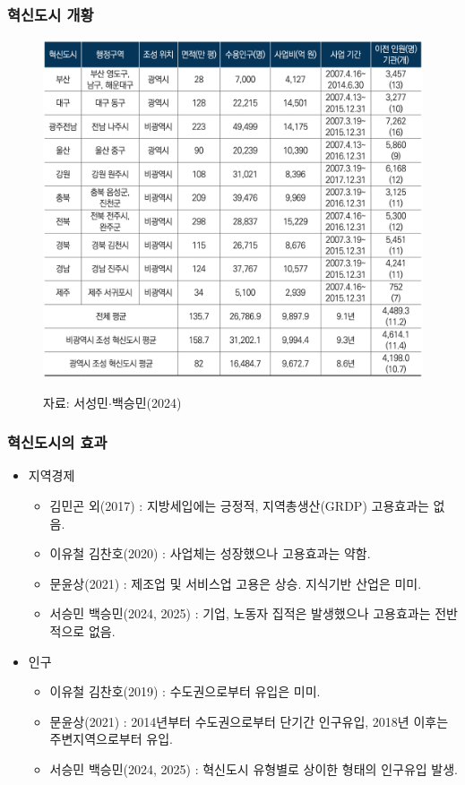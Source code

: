 \documentclass[aspectratio=169,xcolor=dvipsnames,handout]{beamer}
\begin{document}
\begin{frame}
    \frametitle{혁신도시 개황}
    \centering
    \begin{figure}
        \includegraphics[width=.5\textwidth]{pic/혁신도시.png}
        \\
        \raggedright
        \hspace{1em}
        \tiny{자료: 서성민$\cdot$백승민(2024)}
    \end{figure}
\end{frame}

\begin{frame}[allowframebreaks]
    \frametitle{혁신도시의 효과}
    \begin{itemize}[<+->]
        \item 지역경제
        \begin{itemize}[<+->]
            \item 김민곤 외(2017) : 지방세입에는 긍정적, 지역총생산(GRDP) 고용효과는 없음.
            \item 이유철 김찬호(2020) : 사업체는 성장했으나 고용효과는 약함.
            \item 문윤상(2021) : 제조업 및 서비스업 고용은 상승. 지식기반 산업은 미미.
            \item 서승민 백승민(2024, 2025) : 기업, 노동자 집적은 발생했으나 고용효과는 전반적으로 없음.
        \end{itemize}
    \framebreak%
        \item 인구
        \begin{itemize}[<+->]
            \item 이유철 김찬호(2019) : 수도권으로부터 유입은 미미.
            \item 문윤상(2021) : 2014년부터 수도권으로부터 단기간 인구유입, 2018년 이후는 주변지역으로부터 유입.
            \item 서승민 백승민(2024, 2025) : 혁신도시 유형별로 상이한 형태의 인구유입 발생.
        \end{itemize}
    \end{itemize}
\end{frame}
\end{document}
